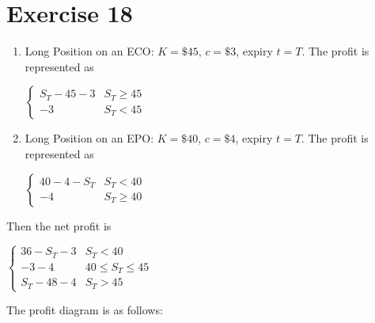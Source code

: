 \documentclass{article}
\begin{document}
\section*{Exercise 18}
\begin{enumerate}
    \item Long Position on an ECO:
    $K = \$45$, $c = \$3$, expiry $t=T$. The profit is represented as
    \begin{center}
        $\begin{cases}
            S_T - 45 - 3 & S_T \geq 45 \\
            -3 & S_T < 45
        \end{cases}$
    \end{center}
    
    \item Long Position on an EPO:
    $K = \$40$, $c = \$4$, expiry $t=T$. The profit is represented as
    \begin{center}
        $\begin{cases}
            40-4-S_T & S_T < 40 \\
            -4 & S_T \geq 40
        \end{cases}$
    \end{center}
\end{enumerate}
Then the net profit is 
\begin{center}
    $\begin{cases}
        36-S_T-3 & S_T < 40 \\
        -3-4 & 40 \leq S_T \leq 45 \\
        S_T - 48 - 4 & S_T > 45
    \end{cases}$
\end{center}
The profit diagram is as follows:
\begin{center}
\end{center}
\end{document}
